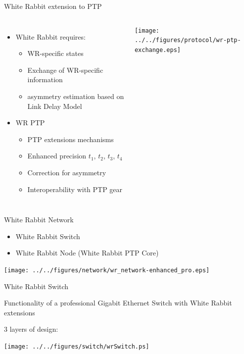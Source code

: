 \documentclass[compress,red]{beamer}
\begin{document}
\begin{frame}{White Rabbit extension to PTP}

\begin{columns}[c]
    \begin{itemize}
	\item White Rabbit requires:
	  \begin{itemize}
	    \item WR-specific states
	    \item Exchange of WR-specific information
      \item asymmetry estimation based on Link Delay Model
	  \end{itemize}
	\item WR PTP
	  \begin{itemize}
	    \item PTP extensions mechanisms
	    \item Enhanced precision $t_1$, $t_2$, $t_3$, $t_4$
	    \item Correction for asymmetry
	    \item Interoperability with PTP gear
	  \end{itemize}
  \end{itemize}
	\begin{center}
	\texttt{[image: ../../figures/protocol/wr-ptp-exchange.eps]}
	\end{center}
\end{columns}

\end{frame}

\begin{frame}{White Rabbit Network}
    \begin{itemize}
      \item White Rabbit Switch
      \item White Rabbit Node (White Rabbit PTP Core)
    \end{itemize}
    \begin{center}
    \texttt{[image: ../../figures/network/wr\_network-enhanced\_pro.eps]}
    \end{center}
\end{frame}

\begin{frame}{White Rabbit Switch}
	\begin{block}{Functionality of a professional Gigabit Ethernet Switch}
	with White Rabbit extensions
	\end{block}
	\begin{block}{3 layers of design:}
	\begin{center}
	\texttt{[image: ../../figures/switch/wrSwitch.ps]}
	\end{center}
	\end{block}
\end{frame}
\end{document}
